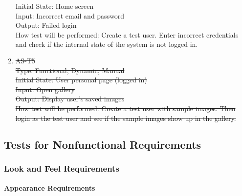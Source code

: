 \documentclass[12pt, titlepage]{article}
\begin{document}
\begin{enumerate}
{Initial State: Home screen\\
					
Input: Incorrect email and password\\
					
Output: Failed login\\
					
How test will be performed: Create a test user. Enter incorrect credentials and check if the internal state of the system is not logged in.\\
}
\item{\sout{AS-T5}}\\
\sout{
Type: Functional, Dynamic, Manual\\
					
Initial State: User personal page (logged in)\\
					
Input: Open gallery\\
					
Output: Display user's saved images\\
					
How test will be performed: Create a test user with sample images. Then login as the test user and see if the sample images show up in the gallery.\\
}
\end{enumerate}

\subsection{Tests for Nonfunctional Requirements}

\subsubsection{Look and Feel Requirements}
		
\paragraph{Appearance Requirements}
\end{document}
